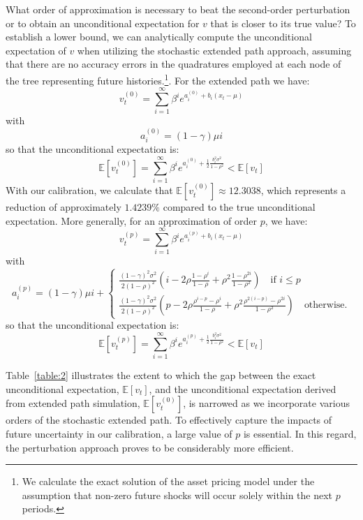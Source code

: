 \documentclass[a4paper,11pt]{amsart}
\begin{document}
What order of approximation is necessary to beat the second-order
perturbation or to obtain an unconditional expectation for $v$ that is
closer to its true value? To establish a lower bound, we can
analytically compute the unconditional expectation of \( v \) when
utilizing the stochastic extended path approach, assuming that there
are no accuracy errors in the quadratures employed at each node of the
tree representing future histories.\footnote{We calculate the exact
   solution of the asset pricing model under the assumption that
   non-zero future shocks will occur solely within the next $p$
   periods.}. For the extended path we have:
\[
   v_t^{(0)} = \sum_{i=1}^\infty \beta^i e^{a_i^{(0)} + b_i (x_t-\mu)}
\]
with
\[
   a_i^{(0)} = (1-\gamma)\mu i
\]
so that the unconditional expectation is:
\[
   \mathbb E\left[v_t^{(0)}\right] = \sum_{i=1}^\infty \beta^ie^{a_i^{(0)} + \frac{1}{2}\frac{b_i^2\sigma^2}{1-\rho^2}} < \mathbb E\left[v_t\right]
\]
With our calibration, we calculate that $\mathbb{E}\left[v_t^{(0)}\right] \approx 12.3038$, which represents a reduction of approximately $1.4239\%$ compared to the true unconditional expectation. More generally, for an approximation of order $p$, we have:
\[
   v_t^{(p)} = \sum_{i=1}^\infty \beta^i e^{a_i^{(p)} + b_i (x_t-\mu)}
\]
with
\[
   a_i^{(p)} = (1-\gamma)\mu i +
   \begin{cases}
      \frac{(1-\gamma)^2\sigma^2}{2(1-\rho)^2}\left( i - 2\rho\frac{1-\rho^i}{1-\rho} + \rho^2\frac{1-\rho^{2i}}{1-\rho^2} \right)\quad\text{if }i\leq p \\
      \frac{(1-\gamma)^2\sigma^2}{2(1-\rho)^2}\left( p - 2\rho\frac{\rho^{i-p}-\rho^i}{1-\rho} + \rho^2\frac{\rho^{2(i-p)}-\rho^{2i}}{1-\rho^2} \right)\quad\text{otherwise.}
   \end{cases}
\]
so that the unconditional expectation is:
\[
   \mathbb E\left[v_t^{(p)}\right] = \sum_{i=1}^\infty \beta^ie^{a_i^{(p)} + \frac{1}{2}\frac{b_i^2\sigma^2}{1-\rho^2}} < \mathbb E\left[v_t\right]
\]

Table~\ref{table:2} illustrates the extent to which the gap between
the exact unconditional expectation, $\mathbb E\left[ v_t \right]$,
and the unconditional expectation derived from extended path
simulation, $\mathbb E\left[ v_t^{(0)}\right]$, is narrowed as we
incorporate various orders of the stochastic extended path. To
effectively capture the impacts of future uncertainty in our
calibration, a large value of \(p\) is essential. In this regard, the
perturbation approach proves to be considerably more
efficient.\newline
\end{document}
